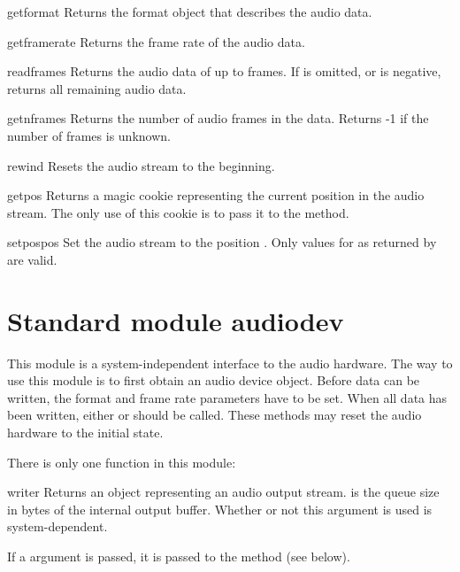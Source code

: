 \begin{funcdesc}{getformat}{}
Returns the format object that describes the audio data.
\end{funcdesc}

\begin{funcdesc}{getframerate}{}
Returns the frame rate of the audio data.
\end{funcdesc}

\begin{funcdesc}{readframes}{}
Returns the audio data of up to  frames.  If 
is omitted, or is negative, returns all remaining audio data.
\end{funcdesc}

\begin{funcdesc}{getnframes}{}
Returns the number of audio frames in the data.  Returns -1 if the
number of frames is unknown.
\end{funcdesc}

\begin{funcdesc}{rewind}{}
Resets the audio stream to the beginning.
\end{funcdesc}

\begin{funcdesc}{getpos}{}
Returns a magic cookie representing the current position in the audio
stream.  The only use of this cookie is to pass it to the
 method.
\end{funcdesc}

\begin{funcdesc}{setpos}{pos}
Set the audio stream to the position .  Only values for
 as returned by  are valid.
\end{funcdesc}

\section{Standard module audiodev}
\renewcommand{\indexsubitem}{(in module audiodev)}

This module is a system-independent interface to the audio hardware.
The way to use this module is to first obtain an audio device object.
Before data can be written, the format and frame rate parameters have
to be set.  When all data has been written, either  or
 should be called.  These methods may reset the audio
hardware to the initial state.

There is only one function in this module:

\begin{funcdesc}{writer}{}
Returns an object representing an audio output stream.   is
the queue size in bytes of the internal output buffer.  Whether or not
this argument is used is system-dependent.

If a  argument is passed, it is passed to the 
method (see below).
\end{funcdesc}

